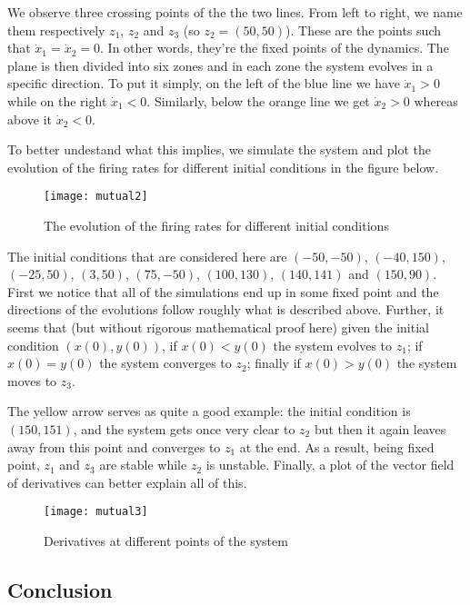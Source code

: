 We observe three crossing points of the the two lines. From left to right,
we name them respectively $z_1$, $z_2$ and $z_3$ (so $z_2 = (50,50)$).
These are the points such that $\dot{x}_1 = \dot{x}_2 = 0$. In other words,
they're the fixed points of the dynamics. The plane is then divided into six
zones and in each zone the system evolves in a specific direction. To put it
simply, on the left of the blue line we have $\dot{x}_1 > 0$ while on the
right $\dot{x}_1 < 0$. Similarly, below the orange line we get
$\dot{x}_2 > 0$ whereas above it $\dot{x}_2 < 0$.

To better undestand what this implies, we simulate the system and plot the 
evolution of the firing rates for different initial conditions in the figure 
below.

\begin{figure}[H]
  \centering
  \texttt{[image: mutual2]}
  \caption
    {The evolution of the firing rates for different initial conditions}
\end{figure}

The initial conditions that are considered here are $(-50, -50)$, $(-40, 150)$,
$(-25, 50)$, $(3, 50)$, $(75, -50)$, $(100, 130)$, $(140, 141)$ and 
$(150, 90)$. First we notice that all of the simulations end up in some fixed
point and the directions of the evolutions follow roughly what is described
above. Further, it seems that (but without rigorous mathematical proof here)
given the initial condition $(x(0),y(0))$, if $x(0) < y(0)$ the system evolves
to $z_1$; if $x(0) = y(0)$ the system converges to $z_2$; finally if 
$x(0) > y(0)$ the system moves to $z_3$.

The yellow arrow serves as quite a good example: the initial condition is 
$(150, 151)$, and the system gets once very clear to $z_2$ but then it again
leaves away from this point and converges to $z_1$ at the end. As a result,
being fixed point, $z_1$ and $z_3$ are stable while $z_2$ is unstable. 
Finally, a plot of the vector field of derivatives can better 
explain all of this.

\begin{figure}[H]
  \centering
  \texttt{[image: mutual3]}
  \caption{Derivatives at different points of the system}
\end{figure}

\subsection{Conclusion}

